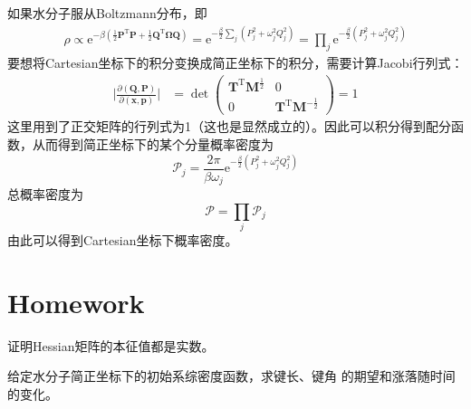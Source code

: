    如果水分子服从Boltzmann分布，即
    \begin{align*}
        \rho \propto \mathrm{e}^{-\beta (\frac 12 \bm{P}^\mathrm{T}\bm{P} + \frac 12 \bm{Q}^\mathrm{T} \bm{\Omega Q})} = \mathrm{e}^{- \frac {\beta}2 \sum_j (P_j^2 + \omega_j^2 Q_j^2)} = \prod_j \mathrm{e}^{-\frac {\beta}2 (P_j^2 + \omega_j^2 Q_j^2)}
    \end{align*}
    要想将Cartesian坐标下的积分变换成简正坐标下的积分，需要计算Jacobi行列式：
    \begin{align*}
        \bigg|\frac {\partial (\bm{Q,P})}{\partial (\bm{x,p})}\bigg| &= \det
        \begin{pmatrix}
            \bm{T}^\mathrm{T}\bm{M}^{\frac 12} & 0\\
            0 & \bm{T}^\mathrm{T}\bm{M}^{-\frac 12}
        \end{pmatrix}
        = 1
    \end{align*}
    这里用到了正交矩阵的行列式为1（这也是显然成立的）。因此可以积分得到配分函数，从而得到简正坐标下的某个分量概率密度为
    \begin{equation*}
        \mathcal{P}_j = \frac {2\pi}{\beta\omega_j} \mathrm{e}^{-\frac {\beta}2 (P_j^2 + \omega_j^2 Q_j^2)}
    \end{equation*}
    总概率密度为
    \begin{equation*}
        \mathcal{P} = \prod_j \mathcal{P}_j
    \end{equation*}
    由此可以得到Cartesian坐标下概率密度。

    \section{Homework}
    \begin{asg}
        证明Hessian矩阵的本征值都是实数。
    \end{asg}
    \begin{asg}
        给定水分子简正坐标下的初始系综密度函数，求键长、键角
        的期望和涨落随时间的变化。
    \end{asg}


    
    
